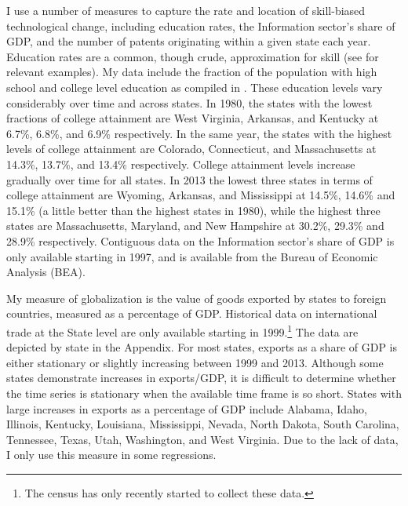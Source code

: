 \documentclass[11pt]{article}
\theoremstyle{definition}
\numberwithin{equation}{section}
\begin{document}
I use a number of measures to capture the rate and location of skill-biased technological change, including education rates, the Information sector's share of GDP, and the number of patents originating within a given state each year. Education rates are a common, though crude, approximation for skill (see \cite{heckman1998explaining} for relevant examples). My data include the fraction of the population with high school and college level education as compiled in \cite{frank2009inequality}. These education levels vary considerably over time and across states. In 1980, the states with the lowest fractions of college attainment are West Virginia, Arkansas, and Kentucky at 6.7\%, 6.8\%, and 6.9\% respectively. In the same year, the states with the highest levels of college attainment are Colorado, Connecticut, and Massachusetts at 14.3\%, 13.7\%, and 13.4\% respectively. College attainment levels increase gradually over time for all states. In 2013 the lowest three states in terms of college attainment are Wyoming, Arkansas, and Mississippi at 14.5\%, 14.6\% and 15.1\% (a little better than the highest states in 1980), while the highest three states are Massachusetts, Maryland, and New Hampshire at 30.2\%, 29.3\% and 28.9\% respectively. Contiguous data on the Information sector's share of GDP is only available starting in 1997, and is available from the Bureau of Economic Analysis (BEA). 


My measure of globalization is the value of goods exported by states to foreign countries, measured as a percentage of GDP. Historical data on international trade at the State level are only available starting in 1999.\footnote{The census has only recently started to collect these data.} The data are depicted by state in the Appendix. For most states, exports as a share of GDP is either stationary or slightly increasing between 1999 and 2013. Although some states demonstrate increases in exports/GDP, it is difficult to determine whether the time series is stationary when the available time frame is so short.  States with large increases in exports as a percentage of GDP include Alabama, Idaho, Illinois, Kentucky, Louisiana, Mississippi, Nevada, North Dakota, South Carolina, Tennessee, Texas, Utah, Washington, and West Virginia. Due to the lack of data, I only use this measure in some regressions. 
\end{document}

